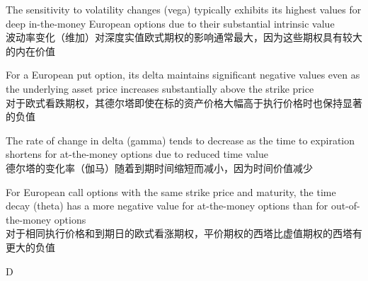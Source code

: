 \documentclass{article}
\begin{document}
\begin{choices}
\item The sensitivity to volatility changes (vega) typically exhibits its highest values for deep in-the-money European options due to their substantial intrinsic value\\
    波动率变化（维加）对深度实值欧式期权的影响通常最大，因为这些期权具有较大的内在价值
\item For a European put option, its delta maintains significant negative values even as the underlying asset price increases substantially above the strike price\\
    对于欧式看跌期权，其德尔塔即使在标的资产价格大幅高于执行价格时也保持显著的负值
\item The rate of change in delta (gamma) tends to decrease as the time to expiration shortens for at-the-money options due to reduced time value\\
    德尔塔的变化率（伽马）随着到期时间缩短而减小，因为时间价值减少
\item For European call options with the same strike price and maturity, the time decay (theta) has a more negative value for at-the-money options than for out-of-the-money options\\
    对于相同执行价格和到期日的欧式看涨期权，平价期权的西塔比虚值期权的西塔有更大的负值
\end{choices}

\begin{correctanswer}
D
\end{correctanswer}
\end{document}
